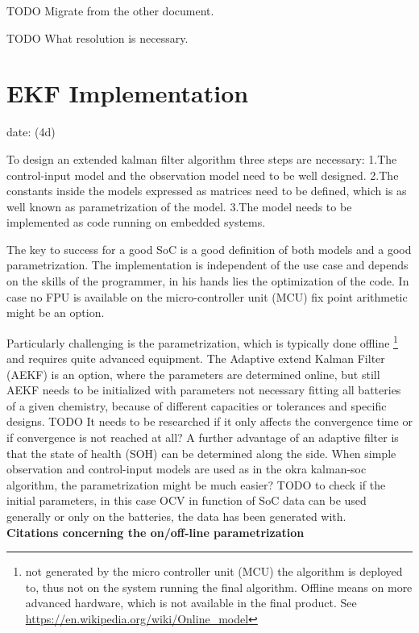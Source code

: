 TODO Migrate from the other document.

TODO What resolution is necessary. 

\section{EKF Implementation}
date: (4d)

To design an extended kalman filter algorithm three steps are necessary:
1.The control-input model and the observation model need to be well designed. 
2.The constants inside the models expressed as matrices need to be defined, which is as well known as parametrization of the model.  
3.The model needs to be implemented as code running on embedded systems. 

The key to success for a good SoC is a good definition of both models and a good parametrization. The implementation is independent of the use case and depends on the skills of the programmer, in his  hands lies the optimization of the  code. In case no FPU is available on the micro-controller unit (MCU) fix point arithmetic might be an option.  

Particularly challenging is the parametrization, which is typically done offline \footnote{not generated by the micro controller unit (MCU) the algorithm is deployed to, thus not on the system running the final algorithm. Offline means on more advanced hardware, which is not available in the final product. See \url{https://en.wikipedia.org/wiki/Online_model} } and requires quite advanced equipment. The Adaptive extend Kalman Filter (AEKF) is an option, where the parameters are determined online, but still AEKF needs to be initialized with parameters not necessary fitting all batteries of a given chemistry, because of different capacities or tolerances and specific designs. 
TODO It needs to be researched if it only affects the convergence time or if convergence is not reached at all? A further advantage of an adaptive filter is that the state of health (SOH) can be determined along the side. 
When simple observation and control-input models are used as in the okra kalman-soc algorithm, the parametrization might be much easier?
TODO to check if the initial parameters, in this case OCV in function of SoC data can be used generally or only on the batteries, the data has been generated with. \\

\textbf{Citations concerning the on/off-line parametrization} \\

